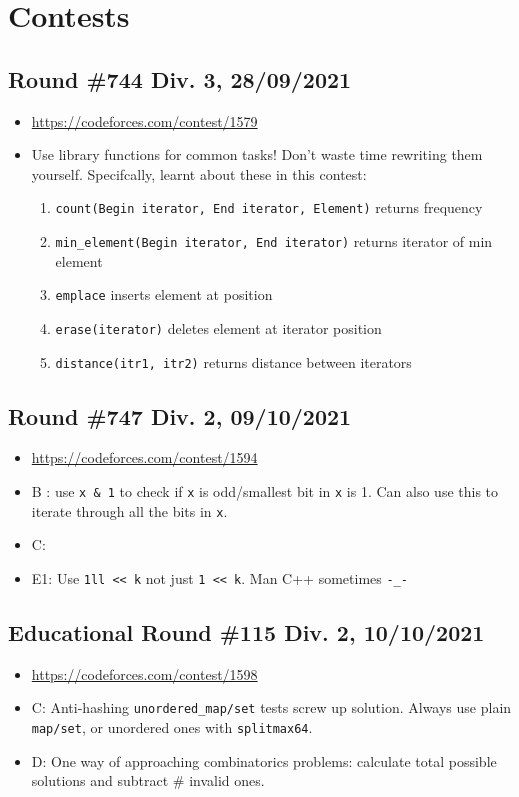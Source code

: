 \documentclass[titlepage, 12pt]{book}
\begin{document}
\section{Contests}
\subsection{Round \#744 Div. 3, 28/09/2021}
\begin{itemize}
  \item \url{https://codeforces.com/contest/1579}
  \item Use library functions for common tasks! Don't waste time rewriting them
    yourself. Specifcally, learnt about these in this contest:
    \begin{enumerate}
      \item \verb|count(Begin iterator, End iterator, Element)| returns
        frequency
      \item \verb|min_element(Begin iterator, End iterator)| returns iterator of
        min element
      \item \verb|emplace| inserts element at position
      \item \verb|erase(iterator)| deletes element at iterator position
      \item \verb|distance(itr1, itr2)| returns distance between iterators
    \end{enumerate}
\end{itemize}
\subsection{Round \#747 Div. 2, 09/10/2021}
\begin{itemize}
  \item\url{https://codeforces.com/contest/1594}
  \item B : use \verb|x & 1| to check if \verb|x| is odd/smallest bit in
    \verb|x| is 1. Can also use this to iterate through all the bits in
    \verb|x|.
  \item C: 
  \item E1: Use \verb|1ll << k| not just \verb|1 << k|. Man C++ sometimes
    \verb|-_-|
\end{itemize}

\subsection{Educational Round \#115 Div. 2, 10/10/2021}
\begin{itemize}
  \item\url{https://codeforces.com/contest/1598}
  \item C: Anti-hashing \verb|unordered_map/set| tests screw up solution. Always
    use plain \verb|map/set|, or unordered ones with \verb|splitmax64|.
  \item D: One way of approaching combinatorics problems: calculate total
    possible solutions and subtract \# invalid ones.
\end{itemize}
\end{document}
